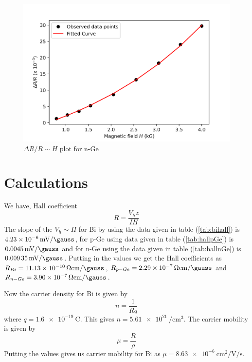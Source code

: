 \documentclass[%
 aip,
 amsmath,amssymb,
 reprint,%
]{revtex4-1}
\begin{document}
\begin{figure}
    \centering
    \includegraphics[scale = 0.56]{Figures/plot-mgrst-Ge.png}
    \caption{$\Delta R/R \sim H$ plot for n-Ge}
    \label{fig:nGemgrst}
\end{figure}
\section{Calculations}
We have, Hall coefficient 
\begin{equation}
\label{hallR}
    R = \dfrac{V_h z}{IH}
\end{equation}
The slope of the $V_h \sim H$ for Bi by using the data given in table (\ref{tab:bihall}) is $\SI{4.23e-6}{\milli \volt \per \gauss}$, for p-Ge using data given in table (\ref{tab:hallpGe}) is $\SI{0.0045}{\milli \volt \per \gauss}$ and for n-Ge using the data given in table (\ref{tab:hallnGe}) is $\SI{0.00935}{\milli \volt \per \gauss}$. Putting in the values we get the Hall coefficients as $R_{Bi} = \SI{11.13e-10}{\ohm \centi \metre \per \gauss}$, $R_{p-Ge} = \SI{2.29e-7}{\ohm \centi \metre \per \gauss}$ and $R_{n-Ge} = \SI{3.90e-7}{\ohm \centi \metre \per \gauss}$.
\par
Now the carrier density for Bi is given by
\begin{equation}
    n = \dfrac{1}{R q}
\end{equation}
where $q = \SI{1.6e-19}{\coulomb}$. This gives $n = \SI{5.61e21}{\per \centi \metre \cubed}$.
The carrier mobility is given by
\begin{equation}
    \mu = \dfrac{R}{\rho}
\end{equation}
Putting the values gives us carrier mobility for Bi as $\mu = \SI{8.63e-6}{\centi \metre \squared \per \volt \per \second}$.
\end{document}
